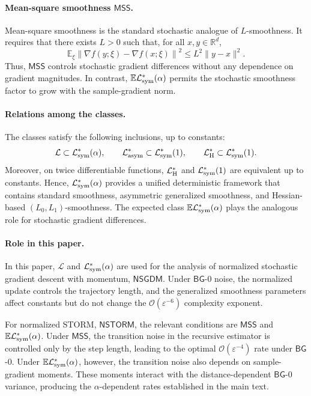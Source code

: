 \documentclass[letter,11pt]{article}
\newcommand{\E}{\mathbb{E}}
\newcommand{\R}{\mathbb{R}}
\newcommand{\Ocal}{\mathcal{O}}
\newcommand{\Lcal}{\mathcal{L}}
\begin{document}
\paragraph{Mean-square smoothness $\mathsf{MSS}$.}
Mean-square smoothness is the standard stochastic analogue of $L$-smoothness. It requires that there exists $L>0$ such that, for all $x,y\in\R^d$,
\begin{equation}
    \label{eq:primer_mss}
    \E_\xi \left\| \nabla f(y;\xi)-\nabla f(x;\xi) \right\|^2 \le L^2\|y-x\|^2.
\end{equation}
Thus, $\mathsf{MSS}$ controls stochastic gradient differences without any dependence on gradient magnitudes. In contrast, $\E\Lcal_{\rm sym}^*(\alpha)$ permits the stochastic smoothness factor to grow with the sample-gradient norm.

\paragraph{Relations among the classes.}
The classes satisfy the following inclusions, up to constants:
\begin{equation}
    \label{eq:primer_class_relations}
    \Lcal \subset \Lcal_{\rm sym}^*(\alpha), \qquad \Lcal_{\rm asym}^* \subset \Lcal_{\rm sym}^*(1), \qquad \Lcal_{\rm H}^* \subset \Lcal_{\rm sym}^*(1).
\end{equation}
Moreover, on twice differentiable functions, $\Lcal_{\rm H}^*$ and $\Lcal_{\rm sym}^*(1)$ are equivalent up to constants. Hence, $\Lcal_{\rm sym}^*(\alpha)$ provides a unified deterministic framework that contains standard smoothness, asymmetric generalized smoothness, and Hessian-based $(L_0,L_1)$-smoothness. The expected class $\E\Lcal_{\rm sym}^*(\alpha)$ plays the analogous role for stochastic gradient differences.

\paragraph{Role in this paper.}
In this paper, $\Lcal$ and $\Lcal_{\rm sym}^*(\alpha)$ are used for the analysis of normalized stochastic gradient descent with momentum, $\mathsf{NSGDM}$. Under $\mathsf{BG}$-0 noise, the normalized update controls the trajectory length, and the generalized smoothness parameters affect constants but do not change the $\Ocal(\varepsilon^{-6})$ complexity exponent.

For normalized STORM, $\mathsf{NSTORM}$, the relevant conditions are $\mathsf{MSS}$ and $\E\Lcal_{\rm sym}^*(\alpha)$. Under $\mathsf{MSS}$, the transition noise in the recursive estimator is controlled only by the step length, leading to the optimal $\Ocal(\varepsilon^{-4})$ rate under $\mathsf{BG}$-0. Under $\E\Lcal_{\rm sym}^*(\alpha)$, however, the transition noise also depends on sample-gradient moments. These moments interact with the distance-dependent $\mathsf{BG}$-0 variance, producing the $\alpha$-dependent rates established in the main text.
\end{document}
